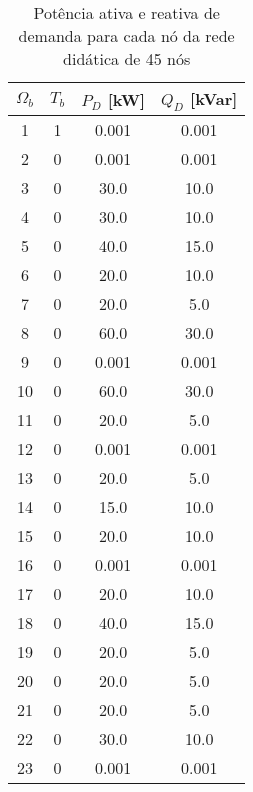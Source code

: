 \begin{table}[H]
    \label{tab:demanda}
    \caption{Potência ativa e reativa de demanda para cada nó da rede didática de 45 nós}
    
    \begin{minipage}{.5\linewidth}
        \centering

        \begin{tabular}{|c|c|c|c|}
            \hline
            $\Omega_b$ & $T_b$ & $P_D$ [kW] & $Q_D$ [kVar]\\ \hline
            1  &  1 &  0.001 &  0.001\\ \hline 
            2  &  0 &  0.001 &  0.001\\ \hline
            3  &  0 &   30.0 &   10.0\\ \hline
            4  &  0 &   30.0 &   10.0\\ \hline
            5  &  0 &   40.0 &   15.0\\ \hline
            6  &  0 &   20.0 &   10.0\\ \hline
            7  &  0 &   20.0 &    5.0\\ \hline
            8  &  0 &   60.0 &   30.0\\ \hline
            9  &  0 &  0.001 &  0.001\\ \hline
            10 &  0 &   60.0 &   30.0\\ \hline
            11 &  0 &   20.0 &    5.0\\ \hline
            12 &  0 &  0.001 &  0.001\\ \hline
            13 &  0 &   20.0 &    5.0\\ \hline
            14 &  0 &   15.0 &   10.0\\ \hline
            15 &  0 &   20.0 &   10.0\\ \hline
            16 &  0 &  0.001 &  0.001\\ \hline
            17 &  0 &   20.0 &   10.0\\ \hline
            18 &  0 &   40.0 &   15.0\\ \hline
            19 &  0 &   20.0 &    5.0\\ \hline
            20 &  0 &   20.0 &    5.0\\ \hline
            21 &  0 &   20.0 &    5.0\\ \hline
            22 &  0 &   30.0 &   10.0\\ \hline
            23 &  0 &  0.001 &  0.001\\ \hline
                 

\end{tabular}
\end{minipage}
\end{table}
